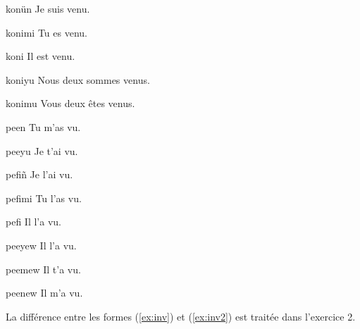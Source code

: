 \documentclass[oldfontcommands,twoside,a4paper,12pt]{article}
\begin{document}
\begin{multicols}{2}
\begin{exe}
\ex 
\glt konün 
\glt Je suis venu.
\end{exe} 

\begin{exe}
\ex 
\glt konimi 
\glt Tu es venu.
\end{exe} 

\begin{exe}
\ex 
\glt koni 
\glt Il est venu.
\end{exe} 

\begin{exe}
\ex 
\glt koniyu
\glt Nous deux sommes venus.
\end{exe} 

\begin{exe}
\ex 
\glt konimu
\glt Vous deux êtes venus.
\end{exe} 

\begin{exe}
\ex 
\glt peen
\glt Tu m'as vu.
\end{exe} 

\begin{exe}
\ex 
\glt peeyu
\glt Je t'ai vu.
\end{exe} 

\begin{exe}
\ex 
\glt pefiñ
\glt Je l'ai vu.
\end{exe} 

\begin{exe}
\ex 
\glt pefimi
\glt Tu l'as vu.
\end{exe} 

\begin{exe}
\ex \label{ex:inv}
\glt pefi
\glt Il l'a vu.
\end{exe} 

\begin{exe}
\ex   \label{ex:inv2}
\glt peeyew
\glt Il l'a vu.  
\end{exe} 

\begin{exe}
\ex 
\glt peemew
\glt Il t'a vu. 
\end{exe} 
 
 \begin{exe}
\ex 
\glt peenew
\glt Il m'a vu. 
\end{exe} 

\end{multicols}


La différence entre les formes (\ref{ex:inv}) et (\ref{ex:inv2}) est traitée dans l'exercice 2.
\end{document}
